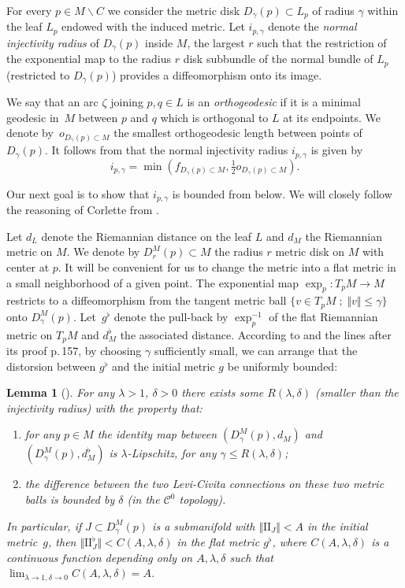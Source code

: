 \documentclass[10pt]{amsart}
\let\mathcal\mathscr
\let\moins\smallsetminus
\newcommand{\II}{\mathrm{II}}
\let\parallel\Vert
\newcommand{\sep}{\;;\;}
\newtheorem{lemma}[theorem]{Lemma}
\theoremstyle{definition}
\theoremstyle{remark}
\numberwithin{equation}{section}
\begin{document}
For every $p\in M\moins C$ we consider the metric disk $D_{\gamma}(p)\subset L_p$ of radius
$\gamma$ within the leaf $L_p$ endowed with the induced metric.
Let $i_{p, \gamma}$ denote the \emph{normal injectivity radius} of $D_{\gamma}(p)$ inside $M$, \ie the largest $r$ such that the restriction of the
exponential map to the radius $r$ disk subbundle of the normal bundle of $L_p$ (restricted to $D_{\gamma}(p)$) provides a diffeomorphism onto its image.

We say that an arc $\zeta$ joining $p,q\in L$ is an \emph{orthogeodesic} if it is a minimal geodesic in~$M$ between $p$ and $q$ which is orthogonal
to $L$ at its endpoints. We denote by~$o_{D_{\gamma}(p)\subset M}$ the smallest orthogeodesic length between points of $D_{\gamma}(p)$.
It follows from \cite[Th.\,4.2]{Herm} that the normal injectivity radius $i_{p,\gamma}$ is given by
\[ i_{p,\gamma}= \min(f_{D_{\gamma}(p)\subset M}, \tfrac12 o_{D_{\gamma}(p)\subset M}). \]

Our next goal is to show that $ i_{p,\gamma}$ is bounded from below. We will closely follow the reasoning of Corlette from
\cite{Cor}.

Let $d_L$ denote the Riemannian distance on the leaf $L$ and $d_M$ the Riemannian metric on $M$.
We denote by $D^M_{r}(p)\subset M$ the radius $r$ metric disk on $M$ with center at $p$.
It will be convenient for us to change the metric into a flat metric in a small neighborhood of a given point. The exponential map $\exp_p: T_pM \to M$
restricts to a diffeomorphism from the tangent metric ball $\{v \in T_pM\sep \parallel v \parallel \leq \gamma\}$ onto $D^M_{\gamma}(p)$.
Let~$g^{\flat}$ denote the pull-back by $\exp_p^{-1}$ of the flat Riemannian metric on $T_pM$ and $d^{\flat}_M$ the associated distance.
According to \cite[Lem.\,2.1]{Cor} and the lines after its proof p.\,157, by choosing $\gamma$ sufficiently small, we can arrange that the distorsion
between $g^{\flat}$ and the initial metric $g$ be uniformly bounded:

\begin{lemma}[{\cite[Lem.\,2.1]{Cor}}]\label{flatdeform}
For any $\lambda >1$, $\delta>0$ there exists some $R(\lambda,\delta)$ (smaller than the injectivity radius) with the property that:
\begin{enumerate}
\item
for any $p\in M$ the identity map between $(D^M_{\gamma}(p), d_M)$ and $(D^M_{\gamma}(p), d^{\flat}_M)$ is
$\lambda$-Lipschitz, for any $\gamma \leq R(\lambda, \delta)$;
\item the difference
between the two Levi-Civita connections on these two metric balls is bounded by
$\delta$ (in the $\mathcal C^0$ topology).
\end{enumerate}
In particular, if $J\subset D^M_{\gamma}(p)$ is a submanifold with $\parallel \II_J\parallel < A$ in the initial metric~$g$, then
$\parallel \II^{\flat}_J\parallel < C(A,\lambda, \delta)$ in the flat metric $g^{\flat}$, where $ C(A,\lambda, \delta)$ is a continuous function
depending only on $A, \lambda, \delta$ such that $\lim_{\lambda \to 1, \delta\to 0}C(A,\lambda,\delta)=A$.
\end{lemma}
\end{document}
